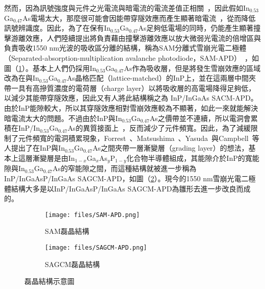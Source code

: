 然而，因為訊號強度與元件之光電流與暗電流的電流差值正相關~\cite{nishida1979ingaasp}，因此假如In$_{0.53}$Ga$_{0.47}$As電場太大，那麼很可能會因能帶穿隧效應而產生顯著暗電流~\cite{forrest1980evidence}\cite{Ando:1980fn}，從而降低訊號辨識度。因此，為了在保有In$_{0.53}$Ga$_{0.47}$As足夠低電場的同時，仍能產生顯著撞擊游離效應，人們陸續提出將負責藉由撞擊游離效應以放大微弱光電流的倍增區與負責吸收1550 nm光波的吸收區分離的結構，稱為SAM分離式雪崩光電二極體（Separated-absorption-multiplication avalanche photodiode，SAM-APD）~\cite{nishida1979ingaasp}\cite{susa1980new}\cite{cook1981low}\cite{kim1981high}，如圖（\ref{fig:SAM-APD}）。基本上人們仍採用In$_{0.53}$Ga$_{0.47}$As作為吸收層，但是將發生雪崩效應的區域改為在與In$_{0.53}$Ga$_{0.47}$As晶格匹配（lattice-matched）的InP上，並在這兩層中間夾帶一具有高摻質濃度的電荷層（charge layer）以將吸收層的高電場降得足夠低，以減少其能帶穿隧效應，因此又有人將此結構稱之為 InP/InGaAs SACM-APD。由於InP能隙較大，所以其穿隧效應相對雪崩效應較為不顯著，如此一來就能解決暗電流太大的問題。不過由於InP與In$_{0.53}$Ga$_{0.47}$As之價帶並不連續，所以電洞會累積在InP/In$_{0.53}$Ga$_{0.47}$As的異質接面上~\cite{forrest1982optical}，反而減少了元件頻寬。因此，為了減緩限制了元件頻寬的電洞積累現象，Forrest~\cite{forrest1982optical}、Matsushima~\cite{matsushima1981new}\cite{matsushima1982high}、Yasuda~\cite{yasuda1983heterojunction}與Campbell~\cite{campbell1983high}等人提出了在InP與In$_{0.53}$Ga$_{0.47}$As之間夾帶一層漸變層（grading layer）的想法，基本上這層漸變層是由In$_{1-x}$Ga$_x$As$_y$P$_{1-y}$化合物半導體組成，其能隙介於InP的寬能隙與In$_{0.53}$Ga$_{0.47}$As的窄能隙之間，而這種結構就被進一步稱為InP/InGaAsP/InGaAs SAGCM-APD，如圖（\ref{fig:SAGCM-APD}）。現今的1550 nm雪崩光電二極體結構大多是以InP/InGaAsP/InGaAs SAGCM-APD為雛形去進一步改良而成的。
\iffalse
緊接著，世上首先將InP/InGaAs雪崩光電二極體作為單光子偵測器的人為1984年的Levine與Bethea~\cite{levine1984single}。
\fi
\begin{figure}[h]
\centering
\begin{subfigure}{.45\textwidth}
\centering
\texttt{[image: files/SAM-APD.png]}
\caption{SAM磊晶結構}
\label{fig:SAM-APD}
\end{subfigure}
\begin{subfigure}{.45\textwidth}
\centering
\texttt{[image: files/SAGCM-APD.png]}
\caption{SAGCM磊晶結構}
\label{fig:SAGCM-APD}
\end{subfigure}
\caption{磊晶結構示意圖}
\label{fig:Epitaxial-structure}
\end{figure}
